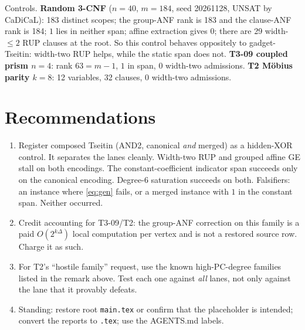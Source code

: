 \documentclass[11pt]{article}
\theoremstyle{definition}
\theoremstyle{remark}
\begin{document}
Controls. \textbf{Random 3-CNF} ($n=40$, $m=184$, seed 20261128, UNSAT by CaDiCaL): 183
distinct scopes; the group-ANF rank is 183 and the clause-ANF rank is 184; $1$ lies in
neither span; affine extraction gives 0; there are 29 width-$\le2$ RUP clauses at the root.
So this control behaves oppositely to gadget-Tseitin: width-two RUP helps, while the static
span does not. \textbf{T3-09 coupled prism $n=4$}: rank $63=m-1$, $1$ in span, 0 width-two
admissions. \textbf{T2 Möbius parity $k=8$}: 12 variables, 32 clauses, 0 width-two
admissions.

\section{Recommendations}
\begin{enumerate}
\item Register composed Tseitin (AND2, canonical \emph{and} merged) as a hidden-XOR control.
It separates the lanes cleanly. Width-two RUP and grouped affine GE stall on both encodings.
The constant-coefficient indicator span succeeds only on the canonical encoding. Degree-$6$
saturation succeeds on both. Falsifiers: an instance where \eqref{eq:gen} fails, or a merged
instance with $1$ in the constant span. Neither occurred.
\item Credit accounting for T3-09/T2: the group-ANF correction on this family is a paid
$O(2^{k\Delta})$ local computation per vertex and is not a restored source row. Charge it as
such.
\item For T2's ``hostile family'' request, use the known high-PC-degree families listed in
the remark above. Test each one against \emph{all} lanes, not only against the lane that it
provably defeats.
\item Standing: restore root \texttt{main.tex} or confirm that the placeholder is intended;
convert the reports to \texttt{.tex}; use the AGENTS.md labels.
\end{enumerate}

\appendix
\end{document}
